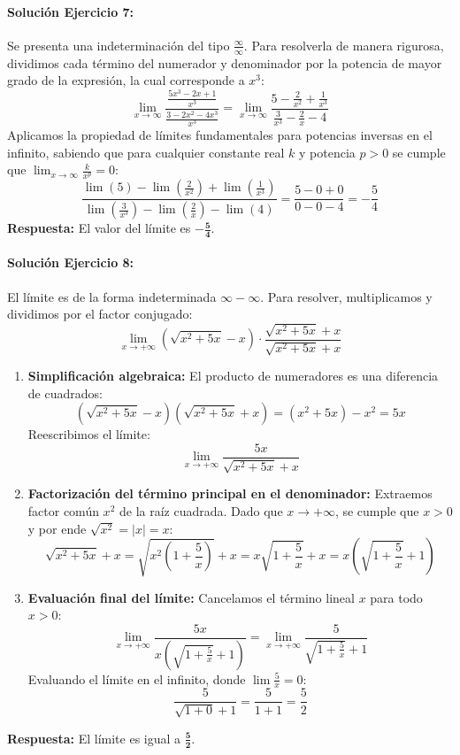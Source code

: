 \documentclass[11pt,letterpaper]{article}
\begin{document}
\paragraph{Solución Ejercicio 7:}
Se presenta una indeterminación del tipo $\frac{\infty}{\infty}$. Para resolverla de manera rigurosa, dividimos cada término del numerador y denominador por la potencia de mayor grado de la expresión, la cual corresponde a $x^3$:
$$\lim_{x\to \infty} \frac{\frac{5x^3 - 2x + 1}{x^3}}{\frac{3 - 2x^2 - 4x^3}{x^3}} = \lim_{x\to \infty} \frac{5 - \frac{2}{x^2} + \frac{1}{x^3}}{\frac{3}{x^3} - \frac{2}{x} - 4}$$
Aplicamos la propiedad de límites fundamentales para potencias inversas en el infinito, sabiendo que para cualquier constante real $k$ y potencia $p > 0$ se cumple que $\lim_{x\to\infty} \frac{k}{x^p} = 0$:
$$\frac{\lim (5) - \lim (\frac{2}{x^2}) + \lim (\frac{1}{x^3})}{\lim (\frac{3}{x^3}) - \lim (\frac{2}{x}) - \lim (4)} = \frac{5 - 0 + 0}{0 - 0 - 4} = -\frac{5}{4}$$
\textbf{Respuesta:} El valor del límite es $\mathbf{-\frac{5}{4}}$.

\paragraph{Solución Ejercicio 8:}
El límite es de la forma indeterminada $\infty - \infty$. Para resolver, multiplicamos y dividimos por el factor conjugado:
$$\lim_{x\to +\infty} \left( \sqrt{x^2 + 5x} - x \right) \cdot \frac{\sqrt{x^2 + 5x} + x}{\sqrt{x^2 + 5x} + x}$$
\begin{enumerate}
    \item \textbf{Simplificación algebraica:} El producto de numeradores es una diferencia de cuadrados:
    $$(\sqrt{x^2 + 5x} - x)(\sqrt{x^2 + 5x} + x) = (x^2 + 5x) - x^2 = 5x$$
    Reescribimos el límite:
    $$\lim_{x\to +\infty} \frac{5x}{\sqrt{x^2 + 5x} + x}$$
    \item \textbf{Factorización del término principal en el denominador:} Extraemos factor común $x^2$ de la raíz cuadrada. Dado que $x \to +\infty$, se cumple que $x > 0$ y por ende $\sqrt{x^2} = |x| = x$:
    $$\sqrt{x^2 + 5x} + x = \sqrt{x^2\left(1 + \frac{5}{x}\right)} + x = x\sqrt{1 + \frac{5}{x}} + x = x\left( \sqrt{1 + \frac{5}{x}} + 1 \right)$$
    \item \textbf{Evaluación final del límite:} Cancelamos el término lineal $x$ para todo $x > 0$:
    $$\lim_{x\to +\infty} \frac{5x}{x\left( \sqrt{1 + \frac{5}{x}} + 1 \right)} = \lim_{x\to +\infty} \frac{5}{\sqrt{1 + \frac{5}{x}} + 1}$$
    Evaluando el límite en el infinito, donde $\lim \frac{5}{x} = 0$:
    $$\frac{5}{\sqrt{1 + 0} + 1} = \frac{5}{1 + 1} = \frac{5}{2}$$
\end{enumerate}
\textbf{Respuesta:} El límite es igual a $\mathbf{\frac{5}{2}}$.
\end{document}
